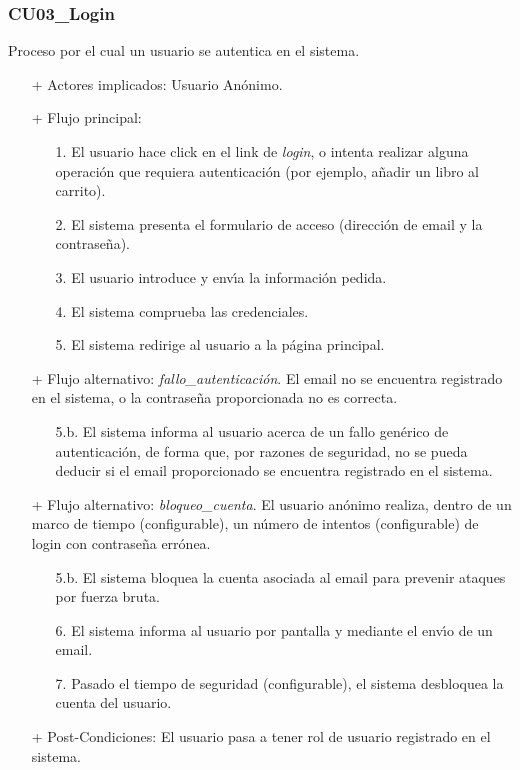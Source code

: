 \documentclass[a4paper]{report}
\begin{document}
            \subsubsection{CU03\_Login}
                Proceso por el cual un usuario se autentica en el sistema.
                \begin{itemize}
                    \item[+] Actores implicados: Usuario An\'onimo.
                    \item[+] Flujo principal:
                    \begin{enumerate}
                        \item[1.] El usuario hace click en el link de \emph{login}, o intenta realizar alguna operaci\'on
                        que requiera autenticaci\'on (por ejemplo, a\~nadir un libro al carrito).
                        \item[2.] El sistema presenta el formulario de acceso (direcci\'on de email y la contrase\~na).
                        \item[3.] El usuario introduce y env\'\i{}a la informaci\'on pedida.
                        \item[4.] El sistema comprueba las credenciales.
                        \item[5.] El sistema redirige al usuario a la p\'agina principal.
                    \end{enumerate}
                    \item[+] Flujo alternativo: \emph{fallo\_autenticaci\'on}. El email no se encuentra registrado en el sistema, o la contrase\~na proporcionada no es correcta.
                    \begin{itemize}
                        \item[5.b.] El sistema informa al usuario acerca de un fallo gen\'erico de autenticaci\'on, de forma que,
                        por razones de seguridad, no se pueda deducir si el email proporcionado se encuentra registrado en el sistema.
                    \end{itemize}
                    \item[+] Flujo alternativo: \emph{bloqueo\_cuenta}. El usuario an\'onimo realiza, dentro de un marco de tiempo (configurable), un n\'umero de intentos (configurable) de login con contrase\~na err\'onea.
                    \begin{itemize}
                        \item[5.b.] El sistema bloquea la cuenta asociada al email para prevenir ataques por fuerza bruta.
                        \item[6.] El sistema informa al usuario por pantalla y mediante el env\'\i{}o de un email.
                        \item[7.] Pasado el tiempo de seguridad (configurable), el sistema desbloquea la cuenta del usuario.
                    \end{itemize}
                    \item[+] Post-Condiciones: El usuario pasa a tener rol de usuario registrado en el sistema.
                \end{itemize}
\end{document}
